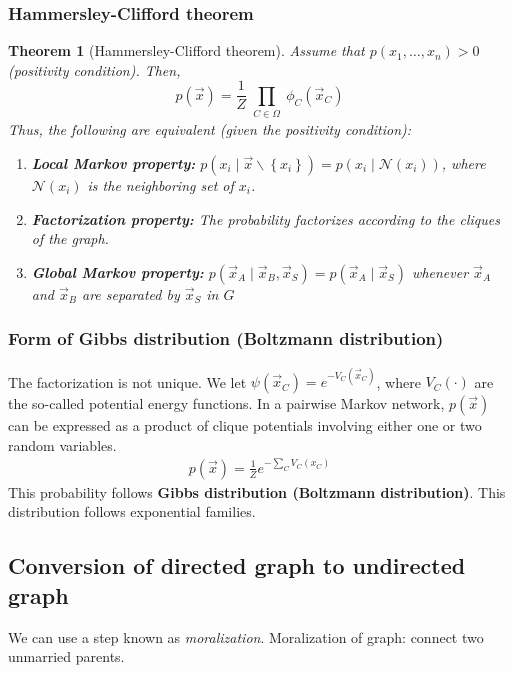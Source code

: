 \documentclass[11pt,a4paper]{article}
\newtheorem{theorem}{Theorem}
\begin{document}
\subsubsection{Hammersley-Clifford theorem}
\begin{theorem}[Hammersley-Clifford theorem]
    Assume that $p\left(x_1, \ldots, x_n\right)>0$ (positivity condition). Then,
    $$
    p(\vec{x})=\frac{1}{Z} \prod_{\substack{C \in \Omega}} \phi_C\left(\vec{x}_C\right)
    $$
    Thus, the following are equivalent (given the positivity condition):
    \begin{enumerate}
        \item \textbf{Local Markov property:} $p\left(x_i \mid \vec{x} \backslash\left\{x_i\right\}\right)=p\left(x_i \mid \mathcal{N}\left(x_i\right)\right)$, where $\mathcal{N}\left(x_i\right)$ is the neighboring set of $x_i$.
        \item \textbf{Factorization property:} The probability factorizes according
        to the cliques of the graph.
        \item \textbf{Global Markov property:} $p\left(\vec{x}_A \mid \vec{x}_B, \vec{x}_S\right)=p\left(\vec{x}_A \mid \vec{x}_S\right)$
        whenever $\vec{x}_A$ and $\vec{x}_B$ are separated by $\vec{x}_S$ in $G$
    \end{enumerate}
\end{theorem}

\subsubsection{Form of Gibbs distribution (Boltzmann distribution)}
The factorization is not unique.
We let $\psi(\vec{x}_C)=e^{-V_C(\vec{x}_C)}$, where $V_C(\cdot)$ are the so-called potential energy functions. In a pairwise Markov network, $p(\vec{x})$ can be expressed as a product of clique potentials involving either one or two random variables.
\begin{equation}
    \begin{aligned}
        p(\vec{x})=\frac{1}{Z}e^{-\sum_CV_C(x_C)}
    \end{aligned}
    \nonumber
\end{equation}
This probability follows \textbf{Gibbs distribution (Boltzmann distribution)}. This distribution follows exponential families.

\subsection{Conversion of directed graph to undirected graph}
We can use a step known as \textit{moralization}.
Moralization of graph: connect two unmarried parents.
\end{document}
